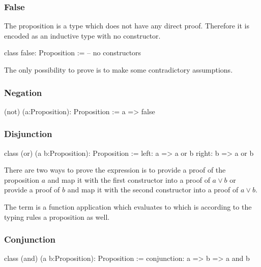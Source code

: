 \subsubsection{False}

The proposition  is a type which does not have any direct
proof. Therefore it is encoded as an inductive type with no constructor.
%
\begin{alba}
  class
    false: Proposition
  :=
    -- no constructors
\end{alba}

The only possibility to prove  is to make some contradictory
assumptions. \vskip 2mm




\subsubsection{Negation}
%
\begin{alba}
  (not) (a:Proposition): Proposition
    := a => false
\end{alba}
\vskip 2mm






\subsubsection{Disjunction}
%
\begin{alba}
  class
    (or) (a b:Proposition): Proposition
  :=
    left:  a => a or b
    right: b => a or b
\end{alba}

There are two ways to prove the expression  is to provide a proof
of the proposition $a$ and map it with the first constructor into a proof of
$a \lor b$ or provide a proof of $b$ and map it with the second constructor
into a proof of $a \lor b$.

The term  is a function application which evaluates to
 which is according to the typing rules a proposition
as well.
\newline




\subsubsection{Conjunction}
%
\begin{alba}
  class
    (and) (a b:Proposition): Proposition
  :=
    conjunction: a => b => a and b
\end{alba}

